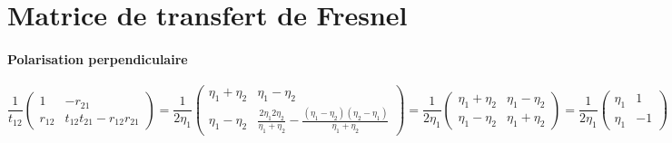 \documentclass[a4paper,english]{article}
\begin{document}
\section{Matrice de transfert de Fresnel}
\paragraph{Polarisation perpendiculaire}
\begin{dmath}\label{mfress}
\frac{1}{t_{12}}\begin{pmatrix} 1 & -r_{21} \\ r_{12} & t_{12}t_{21} - r_{12}r_{21} \end{pmatrix} = 
\frac{1}{2 \eta_1} \begin{pmatrix} \eta_1 + \eta_2 & \eta_1 - \eta_2 \\ \eta_1 - \eta_2 & \frac{2 \eta_1 2 \eta_2}{\eta_1 + \eta_2} - \frac{(\eta_1 - \eta_2)(\eta_2 - \eta_1)}{\eta_1 + \eta_2} \end{pmatrix} =
\frac{1}{2 \eta_1} \begin{pmatrix} \eta_1 + \eta_2 & \eta_1 - \eta_2 \\ \eta_1 - \eta_2 & \eta_1 + \eta_2 \end{pmatrix} = 
\frac{1}{2 \eta_1} \begin{pmatrix} \eta_1 & 1 \\ \eta_1 & -1 \end{pmatrix}\begin{pmatrix} 1 & 1 \\ \eta_2 & -\eta_2 \end{pmatrix}
\end{dmath}
\end{document}
